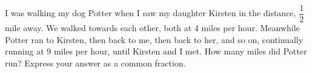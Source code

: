 I was walking my dog Potter when I saw my daughter Kirsten in the distance, $\dfrac{1}{2}$ mile away. We walked towards each other, both at $4$ miles per hour. Meanwhile Potter ran to Kirsten, then back to me, then back to her, and so on, continually running at $9$ miles per hour, until Kirsten and I met. How many miles did Potter run? Express your answer as a common fraction.
